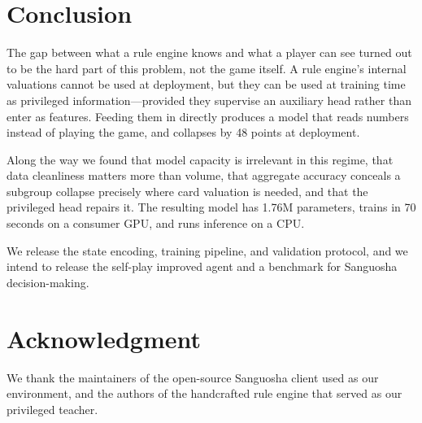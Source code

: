 \documentclass[11pt]{article}
\begin{document}
\section{Conclusion}

The gap between what a rule engine knows and what a player can see turned out to be the hard part of this problem, not the game itself. A rule engine's internal valuations cannot be used at deployment, but they can be used at training time as privileged information---provided they supervise an auxiliary head rather than enter as features. Feeding them in directly produces a model that reads numbers instead of playing the game, and collapses by 48 points at deployment.

Along the way we found that model capacity is irrelevant in this regime, that data cleanliness matters more than volume, that aggregate accuracy conceals a subgroup collapse precisely where card valuation is needed, and that the privileged head repairs it. The resulting model has 1.76M parameters, trains in 70 seconds on a consumer GPU, and runs inference on a CPU.

We release the state encoding, training pipeline, and validation protocol, and we intend to release the self-play improved agent and a benchmark for Sanguosha decision-making.

\section*{Acknowledgment}

We thank the maintainers of the open-source Sanguosha client used as our environment, and the authors of the handcrafted rule engine that served as our privileged teacher.
\end{document}
